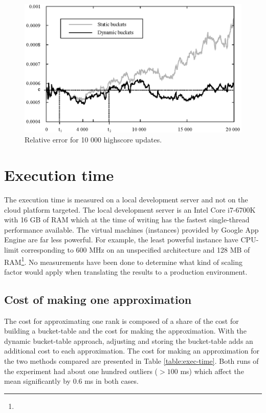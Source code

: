 \begin{figure}[h!]
  \centering
  \caption{Relative error for 10 000 highscore updates.}
  \label{fig:rel-error-10000}
  \includegraphics[width=13cm]{img/rel-error-10000.eps}
\end{figure}

\section{Execution time}

The execution time is measured on a local development server and not on the cloud platform targeted. The local development server is an Intel Core i7-6700K with 16 GB of RAM which at the time of writing has the fastest single-thread performance available. The virtual machines (instances) provided by Google App Engine are far less powerful. For example, the least powerful instance have CPU-limit corresponding to 600 MHz on an unspecified architecture and 128 MB of RAM\footnote{}. No measurements have been done to determine what kind of scaling factor would apply when translating the results to a production environment.

\subsection*{Cost of making one approximation}
The cost for approximating one rank is composed of a share of the cost for building a bucket-table and the cost for making the approximation. With the dynamic bucket-table approach, adjusting and storing the bucket-table adds an additional cost to each approximation. The cost for making an approximation for the two methods compared are presented in Table \ref{table:exec-time}. Both runs of the experiment had about one hundred outliers ($>100$ ms) which affect the mean significantly by  $0.6$ ms in both cases.

